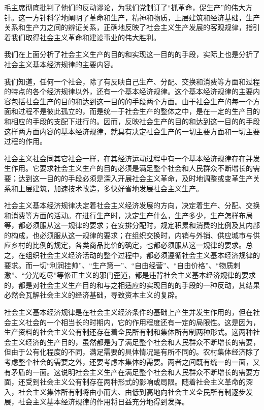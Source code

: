 \documentclass{book}
\begin{document}
毛主席彻底批判了他们的反动谬论，为我们党制订了“抓革命，促生产”的伟大方针。这一方针科学地阐明了革命和生产，精神和物质，上层建筑和经济基础，生产关系和生产力之间的辨证关系，正确地反映了社会主义生产发展的客观规律，指引着我们取得社会主义革命和建设事业的伟大胜利。

我们在上面分析了社会主义生产的目的和实现这一目的的手段，实际上也是分折了社会主义基本经济规律的主要内容。

我们知道，任何一个社会，除了有反映自己生产、分配、交换和消费等方面和过程的特点的各个经济规律以外，还有一个基本经济规律。这个基本经济规律的主要内容包括社会生产的目的和达到这一目的的手段两个方面。由于社会生产的每一个方面和过程不是彼此孤立的，而是统一于社会生产的整体之中，是在一定的生产目的和相应的手段的支配下进行的。因而，反映社会生产的目的和达到这一目的的手段这样两方面内容的基本经济规律，就具有决定社会生产的一切主要方面和一切主要过程的作用。

社会主义社会同其它社会一样，在其经济运动过程中有一个基本经济规律存在并发生作用。它要求社会主义生产的目的必须是满足整个社会和人民群众不断增长的需要；达到这一目的的手段必须是深入开展社会主义革命，及时地调整或变革生产关系和上层建筑，加速技术改造，多快好省地发展社会主义生产。

社会主义基本经济规律决定着社会主义经济发展的方向，决定着生产、分配、交换和消费等方面的活动。在进行生产时，决定生产什么，生产多少，生产怎样布局等，都必须服从这一规律的要求；在安排分配时，规定积累和消费的比例及其内部的构成，也必须服从这一规律的要求；在组织交换时，内销与外销、供应城市与供应乡村的比例的规定，各类商品比价的确定，也都必须服从这一规律的要求。总之，在组织社会主义经济活动的整个过程中，都必须遵循社会主义基本经济规律的要求。而一切“利润挂帅”、“生产第一”、“自由经营”、“自由价格”、“物质刺激”、“分光吃尽”等修正主义的邪门歪道，都是违背社会主义基本经济规律的要求的，都是对社会主义生产目的和与之相适应的实现目的的手段的一种反动，其结果必然会瓦解社会主义的经济基础，导致资本主义的复辟。

社会主义基本经济规律是在社会主义经济条件的基础上产生并发生作用的，但在社会主义社会的一个相当长的时期内，它的作用程度还有一定的局限性。这是因为，生产资料的社会主义公有制还存在着全民所有制和集体所有制两种形式。这两种社会主义经济的生产目的，虽然都是为了满足整个社会和人民群众不断增长的需要，但由于公有化程度的不同，满足需要的具体情况是有所不同的。农村集体经济除了考虑整个社会的需要之外，还要考虑本集体的需要。两者之间既有统一的一面，又有矛盾的一面。这说明社会主义生产在满足整个社会和人民群众不断增长的需要方面，还受到社会主义公有制存在两种形式的影响或局限。随着社会主义革命的深入，社会主义集体所有制将由小而大、由低到高地向社会主义全民所有制逐步发展，社会主义基本经济规律的作用将日益充分地得到发挥。
\end{document}
